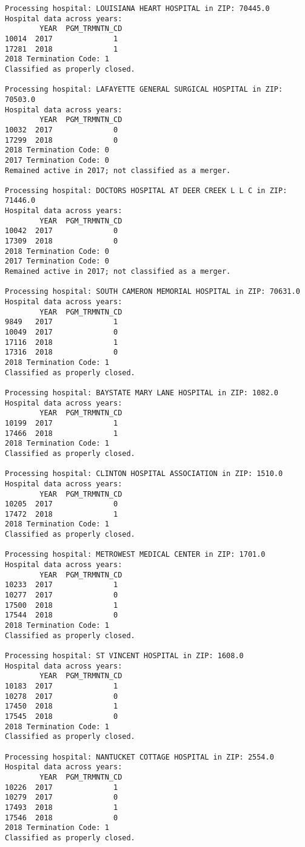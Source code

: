\documentclass[
  letterpaper,
  DIV=11,
  numbers=noendperiod]{scrartcl}
\begin{document}
\begin{verbatim}
Processing hospital: LOUISIANA HEART HOSPITAL in ZIP: 70445.0
Hospital data across years:
        YEAR  PGM_TRMNTN_CD
10014  2017              1
17281  2018              1
2018 Termination Code: 1
Classified as properly closed.

Processing hospital: LAFAYETTE GENERAL SURGICAL HOSPITAL in ZIP: 70503.0
Hospital data across years:
        YEAR  PGM_TRMNTN_CD
10032  2017              0
17299  2018              0
2018 Termination Code: 0
2017 Termination Code: 0
Remained active in 2017; not classified as a merger.

Processing hospital: DOCTORS HOSPITAL AT DEER CREEK L L C in ZIP: 71446.0
Hospital data across years:
        YEAR  PGM_TRMNTN_CD
10042  2017              0
17309  2018              0
2018 Termination Code: 0
2017 Termination Code: 0
Remained active in 2017; not classified as a merger.

Processing hospital: SOUTH CAMERON MEMORIAL HOSPITAL in ZIP: 70631.0
Hospital data across years:
        YEAR  PGM_TRMNTN_CD
9849   2017              1
10049  2017              0
17116  2018              1
17316  2018              0
2018 Termination Code: 1
Classified as properly closed.

Processing hospital: BAYSTATE MARY LANE HOSPITAL in ZIP: 1082.0
Hospital data across years:
        YEAR  PGM_TRMNTN_CD
10199  2017              1
17466  2018              1
2018 Termination Code: 1
Classified as properly closed.

Processing hospital: CLINTON HOSPITAL ASSOCIATION in ZIP: 1510.0
Hospital data across years:
        YEAR  PGM_TRMNTN_CD
10205  2017              0
17472  2018              1
2018 Termination Code: 1
Classified as properly closed.

Processing hospital: METROWEST MEDICAL CENTER in ZIP: 1701.0
Hospital data across years:
        YEAR  PGM_TRMNTN_CD
10233  2017              1
10277  2017              0
17500  2018              1
17544  2018              0
2018 Termination Code: 1
Classified as properly closed.

Processing hospital: ST VINCENT HOSPITAL in ZIP: 1608.0
Hospital data across years:
        YEAR  PGM_TRMNTN_CD
10183  2017              1
10278  2017              0
17450  2018              1
17545  2018              0
2018 Termination Code: 1
Classified as properly closed.

Processing hospital: NANTUCKET COTTAGE HOSPITAL in ZIP: 2554.0
Hospital data across years:
        YEAR  PGM_TRMNTN_CD
10226  2017              1
10279  2017              0
17493  2018              1
17546  2018              0
2018 Termination Code: 1
Classified as properly closed.


\end{verbatim}
\end{document}
